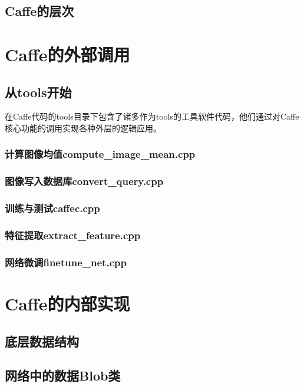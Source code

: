 \documentclass{NanCNBook}
\begin{document}
\chapter{Caffe的层次}

\part{Caffe的外部调用}

\chapter{从tools开始}
在Caffe代码的tools目录下包含了诸多作为tools的工具软件代码，他们通过对Caffe核心功能的调用实现各种外层的逻辑应用。

\section{计算图像均值compute\_image\_mean.cpp}

\section{图像写入数据库convert\_query.cpp}

\section{训练与测试caffec.cpp}

\section{特征提取extract\_feature.cpp}

\section{网络微调finetune\_net.cpp}

\part{Caffe的内部实现}
\chapter{底层数据结构}

\chapter{网络中的数据Blob类}
\end{document}
